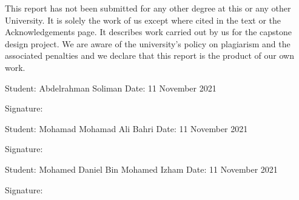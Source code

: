 \documentclass[../main.tex]{subfiles}
\begin{document}
This report has not been submitted for any other degree at this or any other University. 
It is solely the work of us except where cited in the text or the Acknowledgements page. 
It describes work carried out by us for the capstone design project. 
We are aware of the university’s policy on plagiarism and the associated penalties and 
we declare that this report is the product of our own work.

\vspace{2\baselineskip}

\noindent
Student: Abdelrahman Soliman \hfill Date: 11 November 2021

\medskip\noindent
Signature:
%

\vspace{2\baselineskip}

\noindent
Student: Mohamad Mohamad Ali Bahri \hfill Date: 11 November 2021

\medskip\noindent
Signature:
%

\vspace{2\baselineskip}

\noindent
Student: Mohamed Daniel Bin Mohamed Izham \hfill Date: 11 November 2021

\medskip\noindent
Signature:
%
\end{document}
